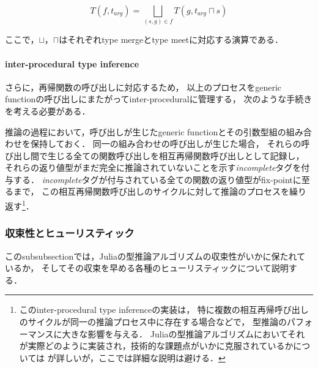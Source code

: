 \[
  T(f,t_{arg}) = \bigsqcup_{(s,g) \in f}T(g,t_{arg} \sqcap s)
\]

ここで，\(\sqcup\)，\(\sqcap\)はそれぞれtype mergeとtype meetに対応する演算である．


\paragraph{inter-procedural type inference}

さらに，再帰関数の呼び出しに対応するため，
以上のプロセスをgeneric functionの呼び出しにまたがってinter-proceduralに管理する，
次のような手続きを考える必要がある．

推論の過程において，呼び出しが生じたgeneric functionとその引数型組の組み合わせを保持しておく．
同一の組み合わせの呼び出しが生じた場合，
それらの呼び出し間で生じる全ての関数呼び出しを相互再帰関数呼び出しとして記録し，
それらの返り値型がまだ完全に推論されていないことを示す\textit{incomplete}タグを付与する．
\textit{incomplete}タグが付与されている全ての関数の返り値型がfix-pointに至るまで，
この相互再帰関数呼び出しのサイクルに対して推論のプロセスを繰り返す\footnote{
  このinter-procedural type inferenceの実装は，
  特に複数の相互再帰呼び出しのサイクルが同一の推論プロセス中に存在する場合などで，
  型推論のパフォーマンスに大きな影響を与える．
  Juliaの型推論アルゴリズムにおいてそれが実際どのように実装され，技術的な課題点がいかに克服されているかについては
  \cite{jameson, jameson-revisited}が詳しいが，ここでは詳細な説明は避ける．
}．

\subsubsection{収束性とヒューリスティック} \label{subsubsection:inference-convergence-and-heuristic}

このsubsubsectionでは，Juliaの型推論アルゴリズムの収束性がいかに保たれているか，
そしてその収束を早める各種のヒューリスティックについて説明する．

